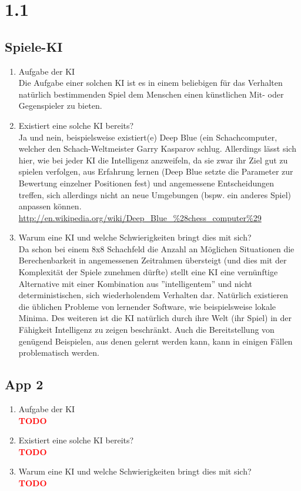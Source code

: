\documentclass[a4paper,11pt,fleqn]{scrartcl}
\title{\titleinfo}
\author{\authorinfo}
\newcommand{\todo}{\textcolor{red}{\textbf{TODO}}}
\begin{document}
\maketitle
\section*{1.1}
\subsection*{Spiele-KI}
\begin{enumerate}
	\item Aufgabe der KI \\
	Die Aufgabe einer solchen KI ist es in einem beliebigen für das Verhalten natürlich bestimmenden Spiel dem Menschen einen künstlichen Mit- oder Gegenspieler zu bieten.
	\item Existiert eine solche KI bereits? \\
	Ja und nein, beispielsweise existiert(e) Deep Blue (ein Schachcomputer, welcher den Schach-Weltmeister Garry Kasparov schlug. Allerdings lässt sich hier, wie bei jeder KI die Intelligenz anzweifeln, da sie zwar ihr Ziel gut zu spielen verfolgen, aus Erfahrung lernen (Deep Blue setzte die Parameter zur Bewertung einzelner Positionen fest) und angemessene Entscheidungen treffen, sich allerdings nicht an neue Umgebungen (bspw. ein anderes Spiel) anpassen können.
	\url{http://en.wikipedia.org/wiki/Deep_Blue_%28chess_computer%29}
	\item Warum eine KI und welche Schwierigkeiten bringt dies mit sich? \\
	Da schon bei einem 8x8 Schachfeld die Anzahl an Möglichen Situationen die Berechenbarkeit in angemessenen Zeitrahmen übersteigt (und dies mit der Komplexität der Spiele zunehmen dürfte) stellt eine KI eine vernünftige Alternative mit einer Kombination aus ''intelligentem'' und nicht deterministischen, sich wiederholendem Verhalten dar. Natürlich existieren die üblichen Probleme von lernender Software, wie beispielsweise lokale Minima. Des weiteren ist die KI natürlich durch ihre Welt (ihr Spiel) in der Fähigkeit Intelligenz zu zeigen beschränkt. Auch die Bereitstellung von genügend Beispielen, aus denen gelernt werden kann, kann in einigen Fällen problematisch werden. 
\end{enumerate}

\subsection*{App 2}
\begin{enumerate}
	\item Aufgabe der KI \\
	\todo
	\item Existiert eine solche KI bereits? \\
	\todo
	\item Warum eine KI und welche Schwierigkeiten bringt dies mit sich? \\
	\todo 
\end{enumerate}
\end{document}

